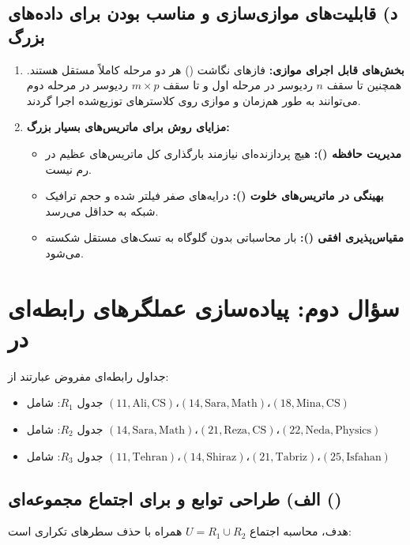 \documentclass[11pt,a4paper]{article}
\begin{document}
	\subsection{د) قابلیت‌های موازی‌سازی و مناسب بودن برای داده‌های بزرگ}
	\begin{enumerate}
		\item \textbf{بخش‌های قابل اجرای موازی:}
		فازهای نگاشت () هر دو مرحله کاملاً مستقل هستند. همچنین تا سقف $n$ ردیوسر در مرحله اول و تا سقف $m \times p$ ردیوسر در مرحله دوم می‌توانند به طور هم‌زمان و موازی روی کلاسترهای توزیع‌شده اجرا گردند.
		\item \textbf{مزایای روش برای ماتریس‌های بسیار بزرگ:}
		\begin{itemize}
			\item \textbf{مدیریت حافظه ():} هیچ پردازنده‌ای نیازمند بارگذاری کل ماتریس‌های عظیم در رم نیست.
			\item \textbf{بهینگی در ماتریس‌های خلوت ():} درایه‌های صفر فیلتر شده و حجم ترافیک شبکه به حداقل می‌رسد.
			\item \textbf{مقیاس‌پذیری افقی ():} بار محاسباتی بدون گلوگاه به تسک‌های مستقل شکسته می‌شود.
		\end{itemize}
	\end{enumerate}
	
	\section{سؤال دوم: پیاده‌سازی عملگرهای رابطه‌ای در }
	
	جداول رابطه‌ای مفروض عبارتند از:
	\begin{itemize}
		\item جدول $R_1$: شامل $(11, \text{Ali}, \text{CS})، (14, \text{Sara}, \text{Math})، (18, \text{Mina}, \text{CS})$
		\item جدول $R_2$: شامل $(14, \text{Sara}, \text{Math})، (21, \text{Reza}, \text{CS})، (22, \text{Neda}, \text{Physics})$
		\item جدول $R_3$: شامل $(11, \text{Tehran})، (14, \text{Shiraz})، (21, \text{Tabriz})، (25, \text{Isfahan})$
	\end{itemize}
	
	\subsection{الف) طراحی توابع  و  برای اجتماع مجموعه‌ای ()}
	هدف، محاسبه اجتماع $U = R_1 \cup R_2$ همراه با حذف سطرهای تکراری است:
	
\end{document}
